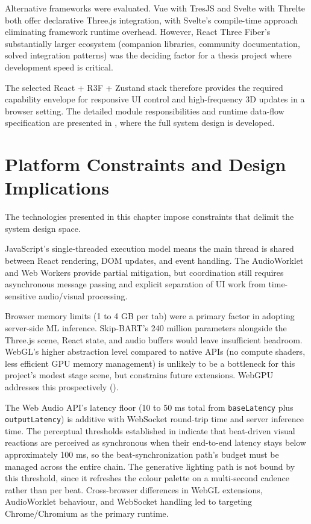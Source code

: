 Alternative frameworks were evaluated. Vue with TresJS and Svelte with Threlte both offer declarative Three.js integration, with Svelte's compile-time approach eliminating framework runtime overhead. However, React Three Fiber's substantially larger ecosystem (companion libraries, community documentation, solved integration patterns) was the deciding factor for a thesis project where development speed is critical.

The selected React + R3F + Zustand stack therefore provides the required capability envelope for responsive UI control and high-frequency 3D updates in a browser setting. The detailed module responsibilities and runtime data-flow specification are presented in , where the full system design is developed.

\section{Platform Constraints and Design Implications}

The technologies presented in this chapter impose constraints that delimit the system design space.

JavaScript's single-threaded execution model means the main thread is shared between React rendering, DOM updates, and event handling. The AudioWorklet and Web Workers provide partial mitigation, but coordination still requires asynchronous message passing and explicit separation of UI work from time-sensitive audio/visual processing.

Browser memory limits (1 to 4 GB per tab) were a primary factor in adopting server-side ML inference. Skip-BART's 240 million parameters alongside the Three.js scene, React state, and audio buffers would leave insufficient headroom. WebGL's higher abstraction level compared to native APIs (no compute shaders, less efficient GPU memory management) is unlikely to be a bottleneck for this project's modest stage scene, but constrains future extensions. WebGPU addresses this prospectively ().

The Web Audio API's latency floor (10 to 50 ms total from \texttt{baseLatency} plus \texttt{outputLatency}) is additive with WebSocket round-trip time and server inference time. The perceptual thresholds established in  indicate that beat-driven visual reactions are perceived as synchronous when their end-to-end latency stays below approximately 100 ms, so the beat-synchronization path's budget must be managed across the entire chain. The generative lighting path is not bound by this threshold, since it refreshes the colour palette on a multi-second cadence rather than per beat. Cross-browser differences in WebGL extensions, AudioWorklet behaviour, and WebSocket handling led to targeting Chrome/Chromium as the primary runtime.

